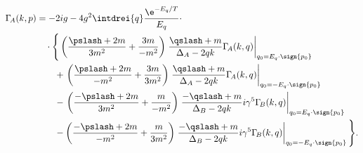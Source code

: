 \begin{equation}
\begin{split}
  \Gamma_{\!A}(k,p)&=-2ig-4g^2\intdrei{q}\frac{\e^{-E_q/T}}{E_q}\cdot\\
  &\quad\cdot\Bigg\{
  \left(\frac{\pslash+2m}{3m^2}+\frac{3m}{-m^2}\right)
  \left.\frac{\qslash+m}{\Delta_A-2qk}
    \Gamma_{\!A}(k,q)\right|_{q_0=E_q\cdot\sign{p_0}} \\
  &\qquad+\left. \left(\frac{\pslash+2m}{-m^2}+\frac{3m}{3m^2}\right)
    \left.\frac{\qslash+m}{\Delta_A-2qk}
      \Gamma_{\!A}(k,q)\right|_{q_0=-E_q\cdot\sign{p_0}} \right.\\
  &\qquad-\left. \left(\frac{-\pslash+2m}{3m^2}+\frac{m}{-m^2}\right)
    \left.\frac{-\qslash+m}{\Delta_B-2qk}
   i\gamma^5\Gamma_{\!B}(k,q)\right|_{q_0=E_q\cdot\sign{p_0}}\right.\\
  &\qquad- \left(\frac{-\pslash+2m}{-m^2}+\frac{m}{3m^2}\right)
  \left.\frac{-\qslash+m}{\Delta_B-2qk}
    i\gamma^5\Gamma_{\!B}(k,q)\right|_{q_0=-E_q\cdot\sign{p_0}}
  \Bigg\}.
\end{split}
\end{equation}


